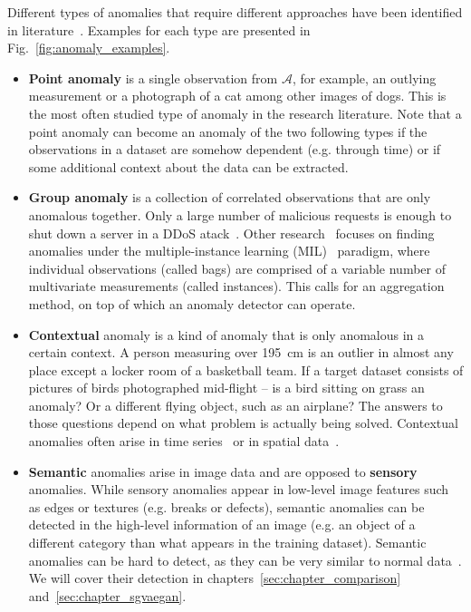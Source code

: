 Different types of anomalies that require different approaches have been identified in literature~\cite{chandola2009anomaly,ruff2020unifying}. Examples for each type are presented in Fig.~\ref{fig:anomaly_examples}.
\begin{itemize}
    \item \textbf{Point anomaly} is a single observation from $\mathcal{A}$, for example, an outlying measurement or a photograph of a cat among other images of dogs. This is the most often studied type of anomaly in the research literature. Note that a point anomaly can become an anomaly of the two following types if the observations in a dataset are somehow dependent (e.g. through time) or if some additional context about the data can be extracted.

    \item \textbf{Group anomaly} is a collection of correlated observations that are only anomalous together. Only a large number of malicious requests is enough to shut down a server in a DDoS atack~\cite{ahmed2018collective}. Other research~\cite{quellec2016multiple,wan2020weakly} focuses on finding anomalies under the multiple-instance learning (MIL)~\cite{carbonneau2018multiple} paradigm, where individual observations (called bags) are comprised of a variable number of multivariate measurements (called instances). This calls for an aggregation method, on top of which an anomaly detector can operate.

    \item \textbf{Contextual} anomaly is a kind of anomaly that is only anomalous in a certain context. A person measuring over 195~cm is an outlier in almost any place except a locker room of a basketball team. If a target dataset consists of pictures of birds photographed mid-flight -- is a bird sitting on grass an anomaly? Or a different flying object, such as an airplane? The answers to those questions depend on what problem is actually being solved. Contextual anomalies often arise in time series~\cite{tsay2000outliers} or in spatial data~\cite{chawla2006slom}.

    \item \textbf{Semantic} anomalies arise in image data and are opposed to \textbf{sensory} anomalies. While sensory anomalies appear in low-level image features such as edges or textures (e.g. breaks or defects), semantic anomalies can be detected in the high-level information of an image (e.g. an object of a different category than what appears in the training dataset). Semantic anomalies can be hard to detect, as they can be very similar to normal data~\cite{ahmed2020detecting}. We will cover their detection in chapters~\ref{sec:chapter_comparison} and~\ref{sec:chapter_sgvaegan}.
\end{itemize}


